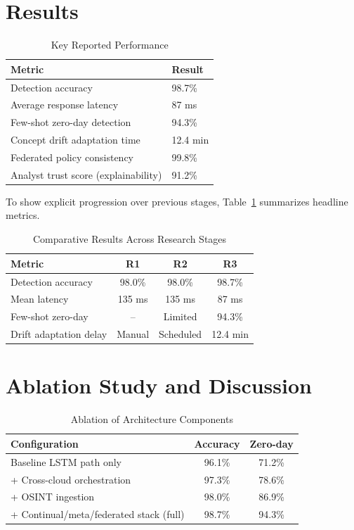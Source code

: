\documentclass[conference]{IEEEtran}
\begin{document}
\section{Results}
\begin{table}[t]
\centering
\caption{Key Reported Performance}
\begin{tabular}{ll}
\toprule
Metric & Result \\
\midrule
Detection accuracy & 98.7\% \\
Average response latency & 87 ms \\
Few-shot zero-day detection & 94.3\% \\
Concept drift adaptation time & 12.4 min \\
Federated policy consistency & 99.8\% \\
Analyst trust score (explainability) & 91.2\% \\
\bottomrule
\end{tabular}
\end{table}

To show explicit progression over previous stages, Table~\ref{tab:lineageresults} summarizes headline metrics.
\begin{table}[t]
\centering
\caption{Comparative Results Across Research Stages}
\label{tab:lineageresults}
\begin{tabular}{lccc}
\toprule
Metric & R1 & R2 & R3 \\
\midrule
Detection accuracy & 98.0\% & 98.0\% & 98.7\% \\
Mean latency & 135 ms & 135 ms & 87 ms \\
Few-shot zero-day & -- & Limited & 94.3\% \\
Drift adaptation delay & Manual & Scheduled & 12.4 min \\
\bottomrule
\end{tabular}
\end{table}

\section{Ablation Study and Discussion}
\begin{table}[t]
\centering
\caption{Ablation of Architecture Components}
\begin{tabular}{lcc}
\toprule
Configuration & Accuracy & Zero-day \\
\midrule
Baseline LSTM path only & 96.1\% & 71.2\% \\
+ Cross-cloud orchestration & 97.3\% & 78.6\% \\
+ OSINT ingestion & 98.0\% & 86.9\% \\
+ Continual/meta/federated stack (full) & 98.7\% & 94.3\% \\
\bottomrule
\end{tabular}
\end{table}
\end{document}
